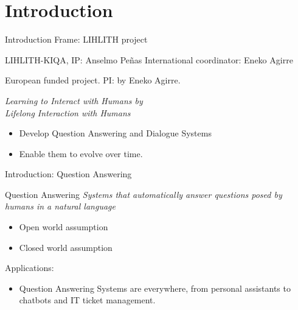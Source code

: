 \documentclass{beamer}
\begin{document}
\section{Introduction}
\begin{frame}{Introduction}
  \alert{\Large Frame: LIHLITH project} \par
  LIHLITH-KIQA, IP: Anselmo Pe\~nas
  International coordinator: Eneko Agirre

  European funded project. PI: by Eneko Agirre. \par

  \textit{Learning to Interact with Humans by \\ Lifelong Interaction with Humans}

  \begin{itemize}
    \item Develop Question Answering and Dialogue Systems
    \item Enable them to evolve over time.
  \end{itemize}
\end{frame}

\begin{frame}{Introduction: Question Answering}
  \begin{block}{Question Answering}
    \vspace{0.2cm}
    \textit{Systems that automatically answer questions posed by humans in a natural language} \\
    \begin{itemize}
      \item Open world assumption
      \item Closed world assumption
    \end{itemize}
    Applications:
    \begin{itemize}
      \item Question Answering Systems are everywhere, from personal assistants to chatbots and IT ticket management.
    \end{itemize}
  \end{block}
\end{frame}

\end{document}
